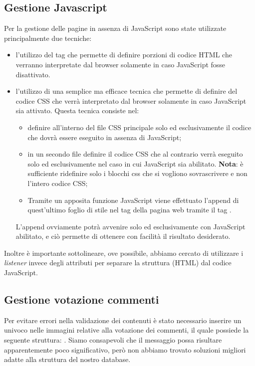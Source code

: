 \documentclass[12pt]{article}
\begin{document}
	\subsection{Gestione Javascript}
	Per la gestione delle pagine in assenza di JavaScript sono state utilizzate principalmente due tecniche:
	\begin{itemize}
			\item l'utilizzo del tag  che permette di definire porzioni di codice HTML che verranno interpretate dal browser solamente in caso JavaScript fosse disattivato.
			\item l'utilizzo di una semplice ma efficace tecnica che permette di definire del codice CSS che verrà interpretato dal browser solamente in caso JavaScript sia attivato. Questa tecnica consiste nel:
			\begin{itemize}
				\item definire all'interno del file CSS principale solo ed esclusivamente il codice che dovrà essere eseguito in assenza di JavaScript;
				\item in un secondo file definire il codice CSS che al contrario verrà eseguito solo ed esclusivamente nel caso in cui JavaScript sia abilitato. \textbf{Nota}: è sufficiente ridefinire solo i blocchi css che si vogliono sovrascrivere e non l'intero codice CSS;
				\item Tramite un apposita funzione JavaScript viene effettuato l'append di quest'ultimo foglio di stile nel tag  della pagina web tramite il tag .
			\end{itemize}
			L'append ovviamente potrà avvenire solo ed esclusivamente con JavaScript abilitato, e ciò permette di ottenere con facilità il risultato desiderato.
	\end{itemize}
	Inoltre è importante sottolineare, ove possibile, abbiamo cercato di utilizzare i \emph{listener} invece degli attributi  per separare la struttura (HTML) dal codice JavaScript.

	\subsection{Gestione votazione commenti}
	Per evitare errori nella validazione dei contenuti è stato necessario inserire un  univoco nelle immagini relative alla votazione dei commenti, il quale possiede la seguente struttura: . Siamo consapevoli che il messaggio possa risultare apparentemente poco significativo, però non abbiamo trovato soluzioni migliori adatte alla struttura del nostro database.
	
\end{document}
